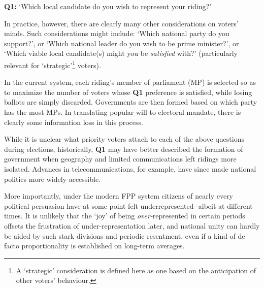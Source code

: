 \begin{tcolorbox}[colback=white!5!white,colframe=blue!55!black]
{\textbf{Q1:} } `Which local candidate do you wish to represent your riding?'
\end{tcolorbox}

In practice, however, there are clearly many other considerations on voters' minds. 
Such considerations might include: `Which national party do you support?', or `Which national leader do you wish to be prime minister?', or `Which viable local candidate(s) might you be \emph{satisfied} with?' (particularly relevant for `strategic'\footnote{A `strategic'  consideration is defined here as one based on the anticipation of other voters' behaviour.} voters). 

In the current system, each riding's member of parliament (MP) is selected so as to maximize the number of voters whose {\textbf{Q1}} preference is satisfied, while losing ballots are simply discarded. Governments are then formed based on which party has the most MPs. 
In translating popular will to electoral mandate, there is clearly some information loss in this process.

While it is unclear what priority voters attach to each of the above questions during elections, historically, \textbf{Q1} may have better described the formation of government when geography and limited communications left ridings more isolated.
Advances in telecommunications, for example, have since made national politics more widely accessible. 



More importantly, under the modern FPP system citizens of nearly every political persuasion have at some point felt underrepresented \--albeit at different times. It is unlikely that the `joy' of being \emph{over-}represented in certain periods offsets the frustration of under-representation later, and
 national unity can hardly be aided by such stark divisions and periodic resentment, even if a kind of de facto proportionality is established on long-term averages. 
 
